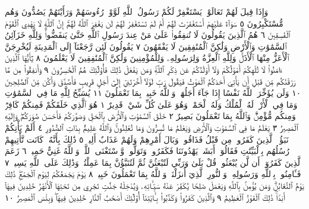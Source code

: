 وَإِذَا قِيلَ لَهُمْ تَعَالَوْا۟ يَسْتَغْفِرْ لَكُمْ رَسُولُ ٱللَّهِ لَوَّوْا۟
رُءُوسَهُمْ وَرَأَيْتَهُمْ يَصُدُّونَ وَهُم مُّسْتَكْبِرُونَ ٥
سَوَآءٌ عَلَيْهِمْ أَسْتَغْفَرْتَ لَهُمْ أَمْ لَمْ تَسْتَغْفِرْ لَهُمْ لَن
يَغْفِرَ ٱللَّهُ لَهُمْۚ إِنَّ ٱللَّهَ لَا يَهْدِي ٱلْقَوْمَ ٱلْفَٰسِقِينَ ٦
هُمُ ٱلَّذِينَ يَقُولُونَ لَا تُنفِقُوا۟ عَلَىٰ مَنْ عِندَ رَسُولِ ٱللَّهِ
حَتَّىٰ يَنفَضُّوا۟ۗ وَلِلَّهِ خَزَآئِنُ ٱلسَّمَٰوَٰتِ وَٱلْأَرْضِ وَلَٰكِنَّ
ٱلْمُنَٰفِقِينَ لَا يَفْقَهُونَ ٧ يَقُولُونَ لَئِن رَّجَعْنَآ إِلَى
ٱلْمَدِينَةِ لَيُخْرِجَنَّ ٱلْأَعَزُّ مِنْهَا ٱلْأَذَلَّۚ وَلِلَّهِ ٱلْعِزَّةُ
وَلِرَسُولِهِۦ وَلِلْمُؤْمِنِينَ وَلَٰكِنَّ ٱلْمُنَٰفِقِينَ لَا يَعْلَمُونَ ٨
يَٰٓأَيُّهَا ٱلَّذِينَ ءَامَنُوا۟ لَا تُلْهِكُمْ أَمْوَٰلُكُمْ وَلَآ أَوْلَٰدُكُمْ
عَن ذِكْرِ ٱللَّهِۚ وَمَن يَفْعَلْ ذَٰلِكَ فَأُو۟لَٰٓئِكَ هُمُ
ٱلْخَٰسِرُونَ ٩ وَأَنفِقُوا۟ مِن مَّا رَزَقْنَٰكُم مِّن قَبْلِ أَن
يَأْتِيَ أَحَدَكُمُ ٱلْمَوْتُ فَيَقُولَ رَبِّ لَوْلَآ أَخَّرْتَنِيٓ إِلَىٰٓ أَجَلࣲ
قَرِيبࣲ فَأَصَّدَّقَ وَأَكُن مِّنَ ٱلصَّٰلِحِينَ ١٠ وَلَن يُؤَخِّرَ
ٱللَّهُ نَفْسًا إِذَا جَآءَ أَجَلُهَاۚ وَٱللَّهُ خَبِيرُۢ بِمَا تَعْمَلُونَ ١١
يُسَبِّحُ لِلَّهِ مَا فِي ٱلسَّمَٰوَٰتِ وَمَا فِي ٱلْأَرْضِۖ لَهُ ٱلْمُلْكُ وَلَهُ ٱلْحَمْدُۖ وَهُوَ
عَلَىٰ كُلِّ شَيْءࣲ قَدِيرٌ ١ هُوَ ٱلَّذِي خَلَقَكُمْ فَمِنكُمْ كَافِرࣱ وَمِنكُم مُّؤْمِنࣱۚ
وَٱللَّهُ بِمَا تَعْمَلُونَ بَصِيرٌ ٢ خَلَقَ ٱلسَّمَٰوَٰتِ وَٱلْأَرْضَ بِٱلْحَقِّ وَصَوَّرَكُمْ
فَأَحْسَنَ صُوَرَكُمْۖ وَإِلَيْهِ ٱلْمَصِيرُ ٣ يَعْلَمُ مَا فِي ٱلسَّمَٰوَٰتِ وَٱلْأَرْضِ
وَيَعْلَمُ مَا تُسِرُّونَ وَمَا تُعْلِنُونَۚ وَٱللَّهُ عَلِيمُۢ بِذَاتِ ٱلصُّدُورِ ٤
أَلَمْ يَأْتِكُمْ نَبَؤُا۟ ٱلَّذِينَ كَفَرُوا۟ مِن قَبْلُ فَذَاقُوا۟ وَبَالَ أَمْرِهِمْ وَلَهُمْ عَذَابٌ
أَلِيمࣱ ٥ ذَٰلِكَ بِأَنَّهُۥ كَانَت تَّأْتِيهِمْ رُسُلُهُم بِٱلْبَيِّنَٰتِ فَقَالُوٓا۟ أَبَشَرࣱ
يَهْدُونَنَا فَكَفَرُوا۟ وَتَوَلَّوا۟ۖ وَّٱسْتَغْنَى ٱللَّهُۚ وَٱللَّهُ غَنِيٌّ حَمِيدࣱ ٦ زَعَمَ ٱلَّذِينَ
كَفَرُوٓا۟ أَن لَّن يُبْعَثُوا۟ۚ قُلْ بَلَىٰ وَرَبِّي لَتُبْعَثُنَّ ثُمَّ لَتُنَبَّؤُنَّ بِمَا عَمِلْتُمْۚ
وَذَٰلِكَ عَلَى ٱللَّهِ يَسِيرࣱ ٧ فَـَٔامِنُوا۟ بِٱللَّهِ وَرَسُولِهِۦ وَٱلنُّورِ ٱلَّذِيٓ أَنزَلْنَاۚ
وَٱللَّهُ بِمَا تَعْمَلُونَ خَبِيرࣱ ٨ يَوْمَ يَجْمَعُكُمْ لِيَوْمِ ٱلْجَمْعِۖ ذَٰلِكَ يَوْمُ ٱلتَّغَابُنِۗ
وَمَن يُؤْمِنۢ بِٱللَّهِ وَيَعْمَلْ صَٰلِحࣰا يُكَفِّرْ عَنْهُ سَيِّـَٔاتِهِۦ وَيُدْخِلْهُ جَنَّٰتࣲ
تَجْرِي مِن تَحْتِهَا ٱلْأَنْهَٰرُ خَٰلِدِينَ فِيهَآ أَبَدࣰاۚ ذَٰلِكَ ٱلْفَوْزُ ٱلْعَظِيمُ ٩
وَٱلَّذِينَ كَفَرُوا۟ وَكَذَّبُوا۟ بِـَٔايَٰتِنَآ أُو۟لَٰٓئِكَ
أَصْحَٰبُ ٱلنَّارِ خَٰلِدِينَ فِيهَاۖ وَبِئْسَ ٱلْمَصِيرُ ١٠
